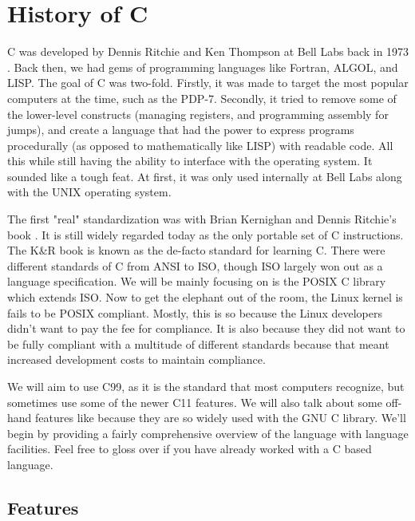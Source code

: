\section{History of C}

C was developed by Dennis Ritchie and Ken Thompson at Bell Labs back in 1973 \cite{Ritchie:1993:DCL:155360.155580}.
Back then, we had gems of programming languages like Fortran, ALGOL, and LISP.
The goal of C was two-fold.
Firstly, it was made to target the most popular computers at the time, such as the PDP-7.
Secondly, it tried to remove some of the lower-level constructs (managing registers, and programming assembly for jumps), and create a language that had the power to express programs procedurally (as opposed to mathematically like LISP) with readable code.
All this while still having the ability to interface with the operating system.
It sounded like a tough feat.
At first, it was only used internally at Bell Labs along with the UNIX operating system.

The first "real" standardization was with Brian Kernighan and Dennis Ritchie's book \cite{kernighan1988c}.
It is still widely regarded today as the only portable set of C instructions.
The K\&R book is known as the de-facto standard for learning C.
There were different standards of C from ANSI to ISO, though ISO largely won out as a language specification.
We will be mainly focusing on is the POSIX C library which extends ISO.
Now to get the elephant out of the room, the Linux kernel is fails to be POSIX compliant.
Mostly, this is so because the Linux developers didn't want to pay the fee for compliance.
It is also because they did not want to be fully compliant with a multitude of different standards because that meant increased development costs to maintain compliance.

We will aim to use C99, as it is the standard that most computers recognize, but sometimes use some of the newer C11 features.
We will also talk about some off-hand features like  because they are so widely used with the GNU C library.
We'll begin by providing a fairly comprehensive overview of the language with language facilities.
Feel free to gloss over if you have already worked with a C based language.

\subsection{Features}

